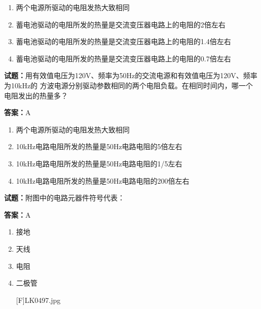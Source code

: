 \documentclass{ctexbook}
\begin{document}
\begin{enumerate}[leftmargin=3em]
  \item 两个电源所驱动的电阻发热大致相同 

  \item 蓄电池驱动的电阻所发的热量是交流变压器电路上的电阻的2倍左右 

  \item 蓄电池驱动的电阻所发的热量是交流变压器电路上的电阻的1.4倍左右 

  \item 蓄电池驱动的电阻所发的热量是交流变压器电路上的电阻的0.7倍左右 

\end{enumerate}





\vspace{1em}

\textbf{试题：}用有效值电压为120V、频率为50Hz的交流电源和有效值电压为120V、频率为10kHz的
方波电源分别驱动参数相同的两个电阻负载。在相同时间内，哪一个电阻发出的热量多？ 

\textbf{答案：}A 

\begin{enumerate}[leftmargin=3em]
  \item 两个电源所驱动的电阻发热大致相同 

  \item 10kHz电路电阻所发的热量是50Hz电路电阻的5倍左右 

  \item 10kHz电路电阻所发的热量是50Hz电路电阻的1/5左右 

  \item 10kHz电路电阻所发的热量是50Hz电路电阻的200倍左右 

\end{enumerate}





\vspace{1em}

\textbf{试题：}附图中的电路元器件符号代表： 

\textbf{答案：}A 

\begin{enumerate}[leftmargin=3em]
  \item 接地 

  \item 天线 

  \item 电阻 


  \item 二极管 

[F]LK0497.jpg 

\end{enumerate}
\end{document}
